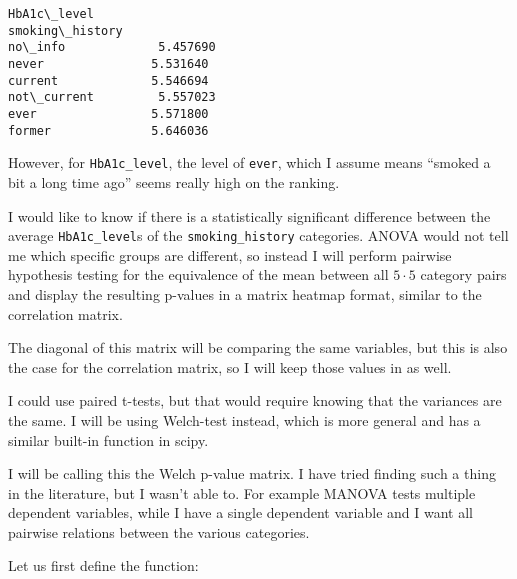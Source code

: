 \documentclass[11pt]{article}
\makeatletter
\newcommand{\boxspacing}{\kern\kvtcb@left@rule\kern\kvtcb@boxsep}
\newcommand{\prompt}[4]{
        {\ttfamily\llap{{\color{#2}[#3]:\hspace{3pt}#4}}\vspace{-\baselineskip}}
    }
\makeatother
\begin{document}
            \begin{tcolorbox}[breakable, size=fbox, boxrule=.5pt, pad at break*=1mm, opacityfill=0]
\prompt{Out}{outcolor}{205}{\boxspacing}
\begin{Verbatim}[commandchars=\\\{\}]
                 HbA1c\_level
smoking\_history
no\_info             5.457690
never               5.531640
current             5.546694
not\_current         5.557023
ever                5.571800
former              5.646036
\end{Verbatim}
\end{tcolorbox}
        
    However, for \texttt{HbA1c\_level}, the level of \texttt{ever}, which I
assume means ``smoked a bit a long time ago'' seems really high on the
ranking.

I would like to know if there is a statistically significant difference
between the average \texttt{HbA1c\_level}s of the
\texttt{smoking\_history} categories. ANOVA would not tell me which
specific groups are different, so instead I will perform pairwise
hypothesis testing for the equivalence of the mean between all
\(5\cdot{}5\) category pairs and display the resulting p-values in a
matrix heatmap format, similar to the correlation matrix.

The diagonal of this matrix will be comparing the same variables, but
this is also the case for the correlation matrix, so I will keep those
values in as well.

I could use paired t-tests, but that would require knowing that the
variances are the same. I will be using Welch-test instead, which is
more general and has a similar built-in function in scipy.

I will be calling this the Welch p-value matrix. I have tried finding
such a thing in the literature, but I wasn't able to. For example MANOVA
tests multiple dependent variables, while I have a single dependent
variable and I want all pairwise relations between the various
categories.

Let us first define the function:
\end{document}
